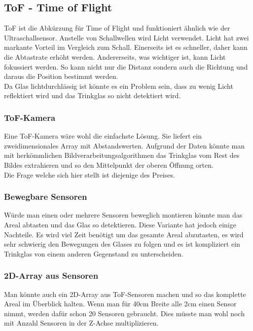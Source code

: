 	\subsection{ToF - Time of Flight }%
	ToF ist die Abkürzung für Time of Flight und funktioniert ähnlich wie der Ultraschallsensor. Anstelle von Schallwellen wird Licht verwendet. Licht hat zwei markante Vorteil im Vergleich zum Schall. Einerseits ist es schneller, daher kann die Abtastrate erhöht werden. Andererseits, was wichtiger ist, kann Licht fokussiert werden. So kann nicht nur die Distanz sondern auch die Richtung und daraus die Position bestimmt werden.\\
	Da Glas lichtdurchlässig ist könnte es ein Problem sein, dass zu wenig Licht reflektiert wird und das Trinkglas so nicht detektiert wird. 
	
		\subsubsection{ToF-Kamera}
		Eine ToF-Kamera wäre wohl die einfachste Lösung. Sie liefert ein zweidimensionales Array mit Abstandswerten. Aufgrund der Daten könnte man mit herkömmlichen Bildverarbeitungsalgorithmen das Trinkglas vom Rest des Bildes extrahieren und so den Mittelpunkt der oberen Öffnung orten.\\		
		Die Frage welche sich hier stellt ist diejenige des Preises. 
		
		\subsubsection{Bewegbare Sensoren}
		Würde man einen oder mehrere Sensoren beweglich montieren könnte man das Areal abtasten und das Glas so detektieren.
		Diese Variante hat jedoch einige Nachteile. Es wird viel Zeit benötigt um das gesamte Areal abzutasten, es wird sehr schwierig den Bewegungen des Glases zu folgen und es ist kompliziert ein Trinkglas von einem anderen Gegenstand zu unterscheiden.
	
		\subsubsection{2D-Array aus Sensoren}
		Man könnte auch ein 2D-Array aus ToF-Sensoren machen und so das komplette Areal im Überblick halten. Wenn man für 40cm Breite alle 2cm einen Sensor nimmt, werden dafür schon 20 Sensoren gebraucht. Dies müsste man wohl noch mit Anzahl Sensoren in der Z-Achse multiplizieren.%
		
